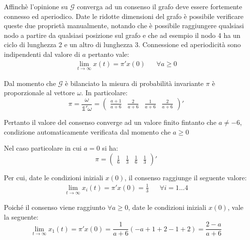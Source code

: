 \documentclass[11pt,largemargins]{homework}
\begin{document}
\begin{alphaparts}

    \questionpart
    Affinchè l'opinione su \(\mathcal{G}\) converga ad un consenso il grafo deve essere fortemente connesso ed aperiodico. Date le ridotte dimensioni del grafo è possibile verificare queste due proprietà manualmente, notando che è possibile raggiungere qualsiasi nodo a partire da qualsiasi posizione sul grafo e che ad esempio il nodo 4 ha un ciclo di lunghezza 2 e un altro di lunghezza 3. Connessione ed aperiodicità sono indipendenti dal valore di \(a\) pertanto vale:
    \begin{align*}
      \lim\limits_{t \rightarrow \infty} x(t)=\pi ' x(0) && \forall a\geq 0
    \end{align*}

    Dal momento che \(\mathcal{G}\) è bilanciato la misura di probabilità invariante \(\pi \) è proporzionale al vettore \(\omega\). In particolare:
    \begin{equation*}
      \pi = \frac{\omega}{\mathbb{1}'\omega}=\begin{pmatrix}
        \frac{a+1}{a+6} & \frac{2}{a+6} & \frac{1}{a+6} & \frac{2}{a+6}
      \end{pmatrix}'
    \end{equation*}

    Pertanto il valore del consenso converge ad un valore finito fintanto che \(a \neq -6\), condizione automaticamente verificata dal momento che \(a \geq 0\)
    \questionpart

    Nel caso particolare in cui \(a=0\) si ha:
    \begin{equation*}
      \pi = \begin{pmatrix}
        \frac{1}{6} & \frac{1}{3} & \frac{1}{6} & \frac{1}{3}
      \end{pmatrix}'
    \end{equation*} 

    Per cui, date le condizioni iniziali \(x(0)\), il consenso raggiunge il seguente valore: 
    \begin{align*}
      \lim\limits_{t \rightarrow \infty} x_i(t)=\pi ' x(0) = \frac{1}{3} && \forall i = 1 \dots 4
    \end{align*}

    \questionpart
    Poiché il consenso viene raggiunto \(\forall a \geq 0 \), date le condizioni iniziali \(x(0)\), vale la seguente:
    \begin{equation*}
      \lim\limits_{t \rightarrow \infty} x_1(t)=\pi ' x(0) = \frac{1}{a+6}(-a+1+2-1+2) = \frac{2-a}{a+6}
    \end{equation*}


\end{alphaparts}
\end{document}
